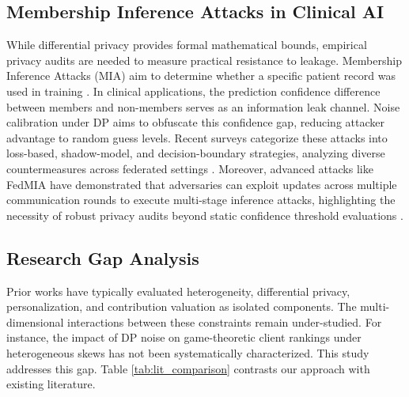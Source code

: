 \documentclass[conference]{IEEEtran}
\begin{document}
\subsection{Membership Inference Attacks in Clinical AI}
While differential privacy provides formal mathematical bounds, empirical privacy audits are needed to measure practical resistance to leakage. Membership Inference Attacks (MIA) aim to determine whether a specific patient record was used in training \cite{Shokri2017MIA}. In clinical applications, the prediction confidence difference between members and non-members serves as an information leak channel. Noise calibration under DP aims to obfuscate this confidence gap, reducing attacker advantage to random guess levels. Recent surveys categorize these attacks into loss-based, shadow-model, and decision-boundary strategies, analyzing diverse countermeasures across federated settings \cite{Bai2025MIA}. Moreover, advanced attacks like FedMIA have demonstrated that adversaries can exploit updates across multiple communication rounds to execute multi-stage inference attacks, highlighting the necessity of robust privacy audits beyond static confidence threshold evaluations \cite{Zhu2025FedMIA}.

\subsection{Research Gap Analysis}
Prior works have typically evaluated heterogeneity, differential privacy, personalization, and contribution valuation as isolated components. The multi-dimensional interactions between these constraints remain under-studied. For instance, the impact of DP noise on game-theoretic client rankings under heterogeneous skews has not been systematically characterized. This study addresses this gap. Table \ref{tab:lit_comparison} contrasts our approach with existing literature.

\begin{table}[t]
\caption{Comparison of Our Approach with Existing Federated Learning Literature}
\centering
{}
\label{tab:lit_comparison}
\end{table}
\end{document}
